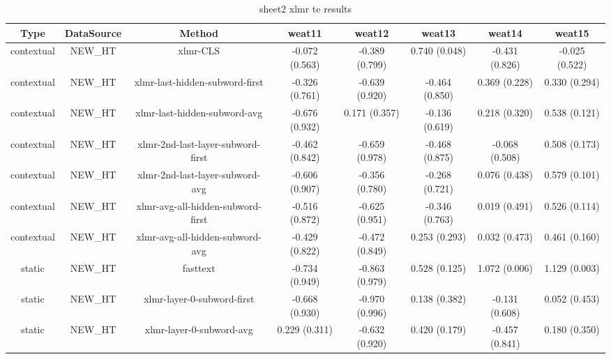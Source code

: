 \begin{sidewaystable}[htb]
    \centering
    \caption{sheet2 xlmr te results}
    \label{appendix_tab:sheet2_xlmr_te_results}
    \small
    \begin{tabular}{@{}cccccccc@{}}
        \toprule
        Type & DataSource & Method & weat11 & weat12 & weat13 & weat14 & weat15 \\
        \midrule
        contextual & NEW\_HT & xlmr-CLS & -0.072 (0.563) & -0.389 (0.799) & 0.740 (0.048) & -0.431 (0.826) & -0.025 (0.522) \\
        contextual & NEW\_HT & xlmr-last-hidden-subword-first & -0.326 (0.761) & -0.639 (0.920) & -0.464 (0.850) & 0.369 (0.228) & 0.330 (0.294) \\
        contextual & NEW\_HT & xlmr-last-hidden-subword-avg & -0.676 (0.932) & 0.171 (0.357) & -0.136 (0.619) & 0.218 (0.320) & 0.538 (0.121) \\
        contextual & NEW\_HT & xlmr-2nd-last-layer-subword-first & -0.462 (0.842) & -0.659 (0.978) & -0.468 (0.875) & -0.068 (0.508) & 0.508 (0.173) \\
        contextual & NEW\_HT & xlmr-2nd-last-layer-subword-avg & -0.606 (0.907) & -0.356 (0.780) & -0.268 (0.721) & 0.076 (0.438) & 0.579 (0.101) \\
        contextual & NEW\_HT & xlmr-avg-all-hidden-subword-first & -0.516 (0.872) & -0.625 (0.951) & -0.346 (0.763) & 0.019 (0.491) & 0.526 (0.114) \\
        contextual & NEW\_HT & xlmr-avg-all-hidden-subword-avg & -0.429 (0.822) & -0.472 (0.849) & 0.253 (0.293) & 0.032 (0.473) & 0.461 (0.160) \\
        static & NEW\_HT & fasttext & -0.734 (0.949) & -0.863 (0.979) & 0.528 (0.125) & 1.072 (0.006) & 1.129 (0.003) \\
        static & NEW\_HT & xlmr-layer-0-subword-first & -0.668 (0.930) & -0.970 (0.996) & 0.138 (0.382) & -0.131 (0.608) & 0.052 (0.453) \\
        static & NEW\_HT & xlmr-layer-0-subword-avg & 0.229 (0.311) & -0.632 (0.920) & 0.420 (0.179) & -0.457 (0.841) & 0.180 (0.350) \\
        \bottomrule
    \end{tabular}
\end{sidewaystable}